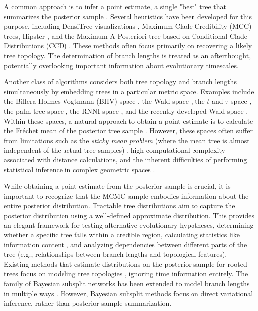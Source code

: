 \documentclass[10pt,letterpaper]{article}
\begin{document}
A common approach is to infer a point estimate, a single "best" tree that summarizes the posterior sample \cite{treesinforest}. Several heuristics have been developed for this purpose, including DensiTree visualizations \cite{densitree}, Maximum Clade Credibility (MCC) trees, Hipster \cite{hipstr}, and the Maximum A Posteriori tree based on Conditional Clade Distributions (CCD) \cite{ccd,ccdlarget}. These methods often focus primarily on recovering a likely tree topology. The determination of branch lengths is treated as an afterthought, potentially overlooking important information about evolutionary timescales.

Another class of algorithms considers both tree topology and branch lengths simultaneously by embedding trees in a particular metric space. Examples include the Billera-Holmes-Vogtmann (BHV) space \cite{bhv}, the Wald space \cite{wald}, the $t$ and $\tau$ space \cite{tauspace}, the palm tree space \cite{tropical}, the RNNI space \cite{rnnispace}, and the recently developed Wald space \cite{wald}. Within these spaces, a natural approach to obtain a point estimate is to calculate the Fréchet mean of the posterior tree sample \cite{frechetmeanvar}. However, these spaces often suffer from limitations such as the \emph{sticky mean problem} (where the mean tree is almost independent of the actual tree samples) \cite{sticky}, high computational complexity associated with distance calculations, and the inherent difficulties of performing statistical inference in complex geometric spaces \cite{riemanngaussian}.

While obtaining a point estimate from the posterior sample is crucial, it is important to recognize that the MCMC sample embodies information about the entire posterior distribution. Tractable tree distributions \cite{ccd} aim to capture the posterior distribution using a well-defined approximate distribution. This provides an elegant framework for testing alternative evolutionary hypotheses, determining whether a specific tree falls within a credible region, calculating statistics like information content \cite{informationcontent}, and analyzing dependencies between different parts of the tree (e.g., relationships between branch lengths and topological features). Existing methods that estimate distributions on the posterior sample for rooted trees focus on modeling tree topologies \cite{ccd,ccdlarget}, ignoring time information entirely. The family of Bayesian subsplit networks \cite{subsplit} has been extended to model branch lengths in multiple ways \cite{subsplitnf,subsplitbranchlengths}. However, Bayesian subsplit methods focus on direct variational inference, rather than posterior sample summarization.
\end{document}
